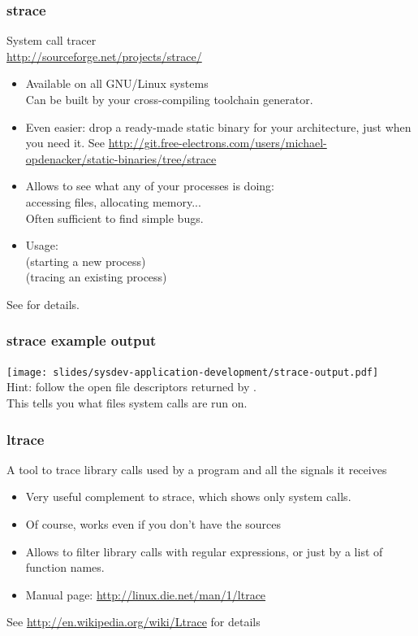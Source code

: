 \begin{frame}
  \frametitle{strace}
  System call tracer\\
  \url{http://sourceforge.net/projects/strace/}
  \begin{itemize}
  \item Available on all GNU/Linux systems\\
    Can be built by your cross-compiling toolchain generator.
  \item Even easier: drop a ready-made static binary for your
        architecture, just when you need it. See
        \url{http://git.free-electrons.com/users/michael-opdenacker/static-binaries/tree/strace}
  \item Allows to see what any of your processes is doing:\\
    accessing files, allocating memory...\\
    Often sufficient to find simple bugs.
  \item Usage:\\
     (starting a new process)\\
     (tracing an existing process)
  \end{itemize}
  See  for details.
\end{frame}

\begin{frame}[fragile]
  \frametitle{strace example output}
  \texttt{[image: slides/sysdev-application-development/strace-output.pdf]}\\
  Hint: follow the open file descriptors returned by . \\
  This tells you what files system calls are run on.
\end{frame}

\begin{frame}
  \frametitle{ltrace}
  A tool to trace library calls used by a program and all the signals
  it receives
  \begin{itemize}
  \item Very useful complement to strace, which shows only system
    calls.
  \item Of course, works even if you don't have the sources
  \item Allows to filter library calls with regular expressions, or
    just by a list of function names.
  \item Manual page: \url{http://linux.die.net/man/1/ltrace}
  \end{itemize}
  See \url{http://en.wikipedia.org/wiki/Ltrace} for details
\end{frame}

